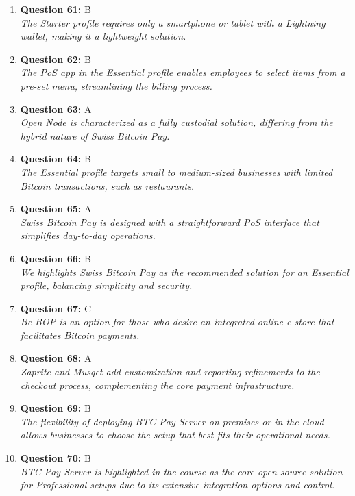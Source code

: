 \documentclass[12pt,a4paper]{article}
\begin{document}
\begin{enumerate}
\item \textbf{Question 61:} B
\\ \textit{The Starter profile requires only a smartphone or tablet with a Lightning wallet, making it a lightweight solution.}

\item \textbf{Question 62:} B
\\ \textit{The PoS app in the Essential profile enables employees to select items from a pre-set menu, streamlining the billing process.}

\item \textbf{Question 63:} A
\\ \textit{Open Node is characterized as a fully custodial solution, differing from the hybrid nature of Swiss Bitcoin Pay.}

\item \textbf{Question 64:} B
\\ \textit{The Essential profile targets small to medium-sized businesses with limited Bitcoin transactions, such as restaurants.}

\item \textbf{Question 65:} A
\\ \textit{Swiss Bitcoin Pay is designed with a straightforward PoS interface that simplifies day-to-day operations.}

\item \textbf{Question 66:} B
\\ \textit{We highlights Swiss Bitcoin Pay as the recommended solution for an Essential profile, balancing simplicity and security.}

\item \textbf{Question 67:} C
\\ \textit{Be-BOP is an option for those who desire an integrated online e-store that facilitates Bitcoin payments.}

\item \textbf{Question 68:} A
\\ \textit{Zaprite and Musqet add customization and reporting refinements to the checkout process, complementing the core payment infrastructure.}

\item \textbf{Question 69:} B
\\ \textit{The flexibility of deploying BTC Pay Server on-premises or in the cloud allows businesses to choose the setup that best fits their operational needs.}

\item \textbf{Question 70:} B
\\ \textit{BTC Pay Server is highlighted in the course as the core open-source solution for Professional setups due to its extensive integration options and control.}


\end{enumerate}
\end{document}
